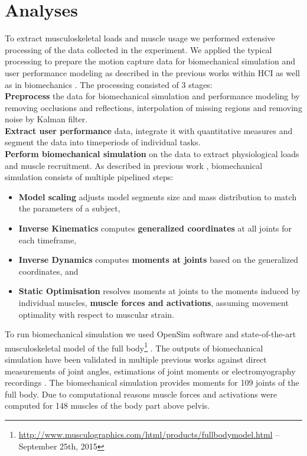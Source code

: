 \section{Analyses}
To extract musculoskeletal loads and muscle usage we performed extensive processing of the data collected in the experiment. We applied the typical processing to prepare the motion capture data for biomechanical simulation and user performance modeling as described in the previous works within HCI as well as in biomechanics \cite{kontaxis2009framework,bachynskyi_performance_2015}.
The processing consisted of 3 stages: \\
\textbf{Preprocess} the data for biomechanical simulation and performance modeling by removing occlusions and reflections, interpolation of missing regions and removing noise by Kalman filter.\\
\textbf{Extract user performance} data, integrate it with quantitative measures and segment the data into timeperiods of individual tasks.\\
\textbf{Perform biomechanical simulation} on the data to extract physiological loads and muscle recruitment. As described in previous work \cite{bachynskyi_performance_2015,opensim}, biomechanical simulation consists of multiple pipelined steps: 
\begin{itemize}
\item \textbf{Model scaling} adjusts model segments size and mass distribution to match the parameters of a subject,
\item \textbf{Inverse Kinematics} computes \textbf{generalized coordinates} at all joints for each timeframe,
\item \textbf{Inverse Dynamics} computes \textbf{moments at joints} based on the generalized coordinates, and
\item \textbf{Static Optimisation} resolves moments at joints to the moments induced by individual muscles, \textbf{muscle forces and activations}, assuming movement optimality with respect to muscular strain.
\end{itemize}
To run biomechanical simulation we used OpenSim software \cite{opensim} and state-of-the-art musculoskeletal model of the full body\footnote{\url{http://www.musculographics.com/html/products/fullbodymodel.html} -- September 25th, 2015} \cite{holzbaur2005model}. The outputs of biomechanical simulation have been validated in multiple previous works against direct measurements of joint angles, estimations of joint moments or electromyography recordings \cite{bachynskyi2014motion}. The biomechanical simulation provides moments for 109 joints of the full body. Due to computational reasons muscle forces and activations were computed for 148 muscles of the body part above pelvis.\\
